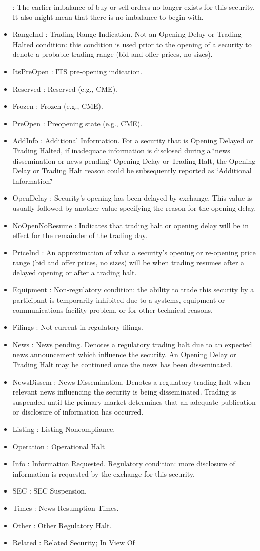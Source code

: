 \begin{itemize}
: The earlier imbalance of buy or sell orders no longer exists for this security. It also might mean that there is no imbalance to begin with. \item Range\-Ind : Trading Range Indication. Not an Opening Delay or Trading Halted condition: this condition is used prior to the opening of a security to denote a probable trading range (bid and offer prices, no sizes). \item Its\-Pre\-Open : ITS pre-opening indication. \item Reserved : Reserved (e.g., CME). \item Frozen : Frozen (e.g., CME). \item Pre\-Open : Preopening state (e.g., CME). \item Add\-Info : Additional Information. For a security that is Opening Delayed or Trading Halted, if inadequate information is disclosed during a \char`\"{}news dissemination or news pending\char`\"{} Opening Delay or Trading Halt, the Opening Delay or Trading Halt reason could be subsequently reported as \char`\"{}Additional Information.\char`\"{} \item Open\-Delay : Security's opening has been delayed by exchange. This value is usually followed by another value specifying the reason for the opening delay. \item No\-Open\-No\-Resume : Indicates that trading halt or opening delay will be in effect for the remainder of the trading day. \item Price\-Ind : An approximation of what a security's opening or re-opening price range (bid and offer prices, no sizes) will be when trading resumes after a delayed opening or after a trading halt. \item Equipment : Non-regulatory condition: the ability to trade this security by a participant is temporarily inhibited due to a systems, equipment or communications facility problem, or for other technical reasons. \item Filings : Not current in regulatory filings. \item News : News pending. Denotes a regulatory trading halt due to an expected news announcement which influence the security. An Opening Delay or Trading Halt may be continued once the news has been disseminated. \item News\-Dissem : News Dissemination. Denotes a regulatory trading halt when relevant news influencing the security is being disseminated. Trading is suspended until the primary market determines that an adequate publication or disclosure of information has occurred. \item Listing : Listing Noncompliance. \item Operation : Operational Halt \item Info : Information Requested. Regulatory condition: more disclosure of information is requested by the exchange for this security. \item SEC : SEC Suspension. \item Times : News Resumption Times. \item Other : Other Regulatory Halt. \item Related : Related Security; In View Of 
\end{itemize}
